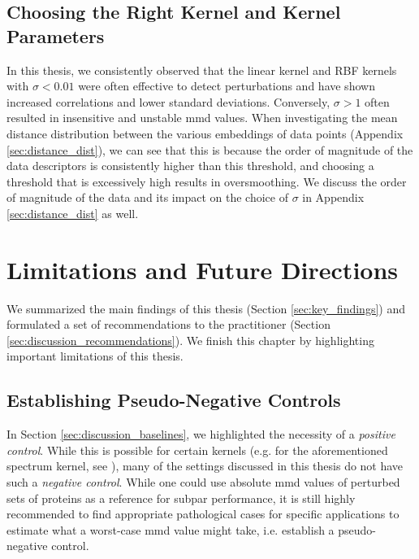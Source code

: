 \subsection{Choosing the Right Kernel and Kernel Parameters}
In this thesis, we consistently observed that the linear kernel and RBF kernels
with $\sigma<0.01$ were often effective to detect perturbations and have shown
increased correlations and lower standard deviations. Conversely, $\sigma>1$
often resulted in insensitive and unstable \acrshort{mmd} values. When
investigating the mean distance distribution between the various embeddings of
data points (Appendix \ref{sec:distance_dist}), we can see that this is because
the order of magnitude of the data descriptors is consistently higher than this
threshold, and choosing a threshold that is excessively high results in
oversmoothing. We discuss the order of magnitude of the data and its impact on
the choice of $\sigma$ in Appendix \ref{sec:distance_dist} as well.

\section{Limitations and Future Directions}\label{sec:discussion_limitations}

We summarized the main findings of this thesis (Section \ref{sec:key_findings})
and formulated a set of recommendations to the practitioner (Section
\ref{sec:discussion_recommendations}). We finish this chapter by highlighting
important limitations of this thesis.


\subsection{Establishing Pseudo-Negative Controls}

In Section \ref{sec:discussion_baselines}, we highlighted the necessity of a
\emph{positive control}. While this is possible for certain kernels (e.g. for
the aforementioned spectrum kernel, see \cite{kucera2022conditional}), many of
the settings discussed in this thesis do not have such a \emph{negative control}.
While one could use absolute \acrshort{mmd} values of perturbed sets of proteins
as a reference for subpar performance, it is still highly recommended to find
appropriate pathological cases for specific applications to estimate what a
worst-case \acrshort{mmd} value might take, i.e. establish a pseudo-negative control.

